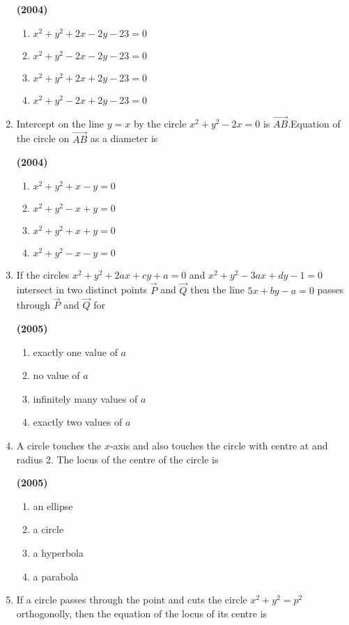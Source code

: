 \documentclass[journal,12pt,twocolumn]{IEEEtran}
\theoremstyle{remark}
\begin{document}
\begin{enumerate}[start=6]
\hfill{\textbf{(2004)}}

\begin{enumerate}[label=(\alph*)]
\item $x^2+y^2+2x-2y-23=0$
\item $x^2+y^2-2x-2y-23=0$
\item $x^2+y^2+2x+2y-23=0$
\item $x^2+y^2-2x+2y-23=0$
\end{enumerate}
\item Intercept on the line $y=x$ by the circle $x^2+y^2-2x=0$ is $\vec{AB}$.Equation of the circle on $\vec{AB}$ as a diameter is 

\hfill{\textbf{(2004)}}

\begin{enumerate}[label=(\alph*)]
\item $x^2+y^2+x-y=0$
\item $x^2+y^2-x+y=0$
\item $x^2+y^2+x+y=0$
\item $x^2+y^2-x-y=0$
\end{enumerate}
\item If the circles $x^2+y^2+2ax+cy+a=0$ and $x^2+y^2-3ax+dy-1=0$ intersect in two distinct points $\vec{P}$ and $\vec{Q}$ then the line $5x+by-a=0$ passes through $\vec{P}$ and $\vec{Q}$ for

\hfill{\textbf{(2005)}}

\begin{enumerate}[label=(\alph*)]
\item exactly one value of $a$
\item no value of $a$
\item infinitely many values of $a$
\item exactly two values of $a$
\end{enumerate}
\item A circle touches the $x$-axis and also touches the circle with centre at  and radius 2. The locus of the centre of the circle is

\hfill{\textbf{(2005)}}

\begin{multicols}{2}
\begin{enumerate}[label=(\alph*)]
\item an ellipse
\item a circle 
\item a hyperbola
\item a parabola
\end{enumerate}
\end{multicols}
\item If a circle passes through the point  and cuts the circle $x^2+y^2=p^2$ orthogonolly, then the equation of the locus of its centre is 


\end{enumerate}
\end{document}
